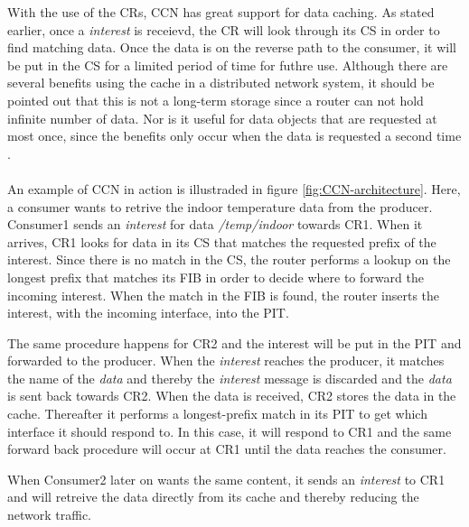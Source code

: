 With the use of the CRs, CCN has great support for data caching. As stated earlier, once a \textit{interest} is receievd, the CR will look through its CS in order to find matching data. Once the data is on the reverse path to the consumer, it will be put in the CS for a limited period of time for futhre use. Although there are several benefits using the cache in a distributed network system, it should be pointed out that this is not a long-term storage since a router can not hold infinite number of data. Nor is it useful for data objects that are requested at most once, since the benefits only occur when the data is requested a second time \cite{Ahlgreniot}\cite{Ahlgren2012}. %
\\\\
An example of CCN in action is illustraded in figure \ref{fig:CCN-architecture}. Here, a consumer wants to retrive the indoor temperature data from the producer.
Consumer1 sends an \textit{interest} for data \textit{/temp/indoor} towards CR1. When it arrives, CR1 looks for data in its CS that matches the requested prefix of the interest. Since there is no match in the CS, the router performs a lookup on the longest prefix that matches its FIB in order to decide where to forward the incoming interest. When the match in the FIB is found, the router inserts the interest, with the incoming interface, into the PIT.

The same procedure happens for CR2 and the interest will be put in the PIT and forwarded to the producer. When the \textit{interest} reaches the producer, it matches the name of the \textit{data} and thereby the \textit{interest} message is discarded and the \textit{data} is sent back towards CR2. When the data is received, CR2 stores the data in the cache. Thereafter it performs a longest-prefix match in its PIT to get which interface it should respond to. In this case, it will respond to CR1 and the same forward back procedure will occur at CR1 until the data reaches the consumer.

When Consumer2 later on wants the same content, it sends an \textit{interest} to CR1 and will retreive the data directly from its cache and thereby reducing the network traffic.



